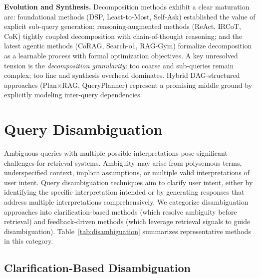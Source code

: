 \documentclass{article}
\begin{document}
\textbf{Evolution and Synthesis.} Decomposition methods exhibit a clear maturation arc: foundational methods (DSP, Least-to-Most, Self-Ask) established the value of explicit sub-query generation; reasoning-augmented methods (ReAct, IRCoT, CoK) tightly coupled decomposition with chain-of-thought reasoning; and the latest agentic methods (CoRAG, Search-o1, RAG-Gym) formalize decomposition as a learnable process with formal optimization objectives. A key unresolved tension is the \textit{decomposition granularity}: too coarse and sub-queries remain complex; too fine and synthesis overhead dominates. Hybrid DAG-structured approaches (Plan×RAG, QueryPlanner) represent a promising middle ground by explicitly modeling inter-query dependencies.

\section{Query Disambiguation}\label{sec:disambiguation}

Ambiguous queries with multiple possible interpretations pose significant challenges for retrieval systems. Ambiguity may arise from polysemous terms, underspecified context, implicit assumptions, or multiple valid interpretations of user intent. Query disambiguation techniques aim to clarify user intent, either by identifying the specific interpretation intended or by generating responses that address multiple interpretations comprehensively. We categorize disambiguation approaches into clarification-based methods (which resolve ambiguity before retrieval) and feedback-driven methods (which leverage retrieval signals to guide disambiguation). Table~\ref{tab:disambiguation} summarizes representative methods in this category.

\vspace{0.3em}
\noindent{}
\vspace{0.3em}

\subsection{Clarification-Based Disambiguation}
\end{document}
